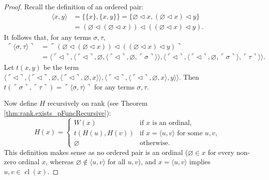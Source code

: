 \begin{proof}
    Recall the definition of an ordered pair:
    \begin{equation*}
        \begin{split}
    \langle x, y \rangle & = \{\{x\}, \{x, y\}\} = 
        \{\varnothing \lhd x, (\varnothing \lhd x) \lhd y\} \\
        & = (\varnothing \lhd (\varnothing \lhd x)) \lhd
        ((\varnothing \lhd x) \lhd y).
        \end{split}
    \end{equation*}
    It follows that, for any terms $\sigma,\tau$,
    \begin{equation*}
        \begin{split}
            \ulcorner {\langle \sigma, \tau \rangle} \urcorner & =
            \ulcorner {(\varnothing \lhd (\varnothing \lhd x)) \lhd
            ((\varnothing \lhd x) \lhd y)} \urcorner \\
            & = \langle \ulcorner{\lhd}\urcorner,
            \langle\ulcorner{\lhd}\urcorner, \varnothing,
            \langle \ulcorner{\lhd}\urcorner, \varnothing, 
            \ulcorner{\sigma}\urcorner \rangle  \rangle,
            \langle \ulcorner{\lhd}\urcorner, 
            \langle \ulcorner{\lhd}\urcorner, \varnothing, 
            \ulcorner{\sigma}\urcorner \rangle, 
            \ulcorner{\tau}\urcorner \rangle \rangle.
        \end{split}
    \end{equation*}
    Let $t(x,y)$ be the term 
    $\langle \ulcorner{\lhd}\urcorner,
    \langle\ulcorner{\lhd}\urcorner, \varnothing,
    \langle \ulcorner{\lhd}\urcorner, \varnothing, x \rangle  \rangle,
    \langle \ulcorner{\lhd}\urcorner, 
    \langle \ulcorner{\lhd}\urcorner, \varnothing, x \rangle, y \rangle \rangle$.
    Then $t(\ulcorner{\sigma}\urcorner, \ulcorner{\tau}\urcorner) = 
    \ulcorner {\langle \sigma, \tau \rangle} \urcorner$ for any terms $\sigma,\tau$.

    Now define $H$ recursively on rank (see Theorem \ref{thm:rank.exists_pFuncRecursive}):
    $$
    H(x) = \begin{cases}
        W(x) & \text{if $x$ is an ordinal}, \\
        t(H(u), H(v)) & \text{if } x = \langle u, v \rangle \text{ for some } u,v, \\
        \varnothing & \text{otherwise}.
    \end{cases}
    $$
    This definition makes sense as no ordered pair is an ordinal 
    ($\varnothing \in x$ for every non-zero ordinal $x$, whereas 
    $\varnothing \notin \langle u, v\rangle$ for all $u,v$), and
    $x = \langle u, v \rangle$ implies $u,v \in \operatorname{cl}(x)$.


\end{proof}
